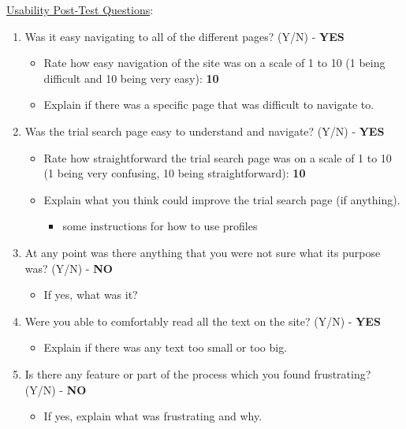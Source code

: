 \documentclass[12pt]{article}
\begin{document}
\noindent \underline{Usability Post-Test Questions}:
\begin{enumerate}
  \item Was it easy navigating to all of the different pages? (Y/N) - \textbf{YES}
    \begin{itemize}
      \item Rate how easy navigation of the site was on a scale of 1 to 10 (1 being difficult and 10 being very easy): \textbf{10}
      \item Explain if there was a specific page that was difficult to navigate to.
    \end{itemize}
	\item Was the trial search page easy to understand and navigate? (Y/N) - \textbf{YES}
    \begin{itemize}
      \item Rate how straightforward the trial search page was on a scale of 1 to 10 (1 being very confusing, 10 being straightforward): \textbf{10}
      \item Explain what you think could improve the trial search page (if anything).
      \begin{itemize}
        \item some instructions for how to use profiles
      \end{itemize}
    \end{itemize}
  \item At any point was there anything that you were not sure what its purpose was? (Y/N) - \textbf{NO}
    \begin{itemize}
      \item If yes, what was it?
    \end{itemize}
  \item Were you able to comfortably read all the text on the site? (Y/N) - \textbf{YES}
    \begin{itemize}
      \item Explain if there was any text too small or too big.
    \end{itemize}
  \item  Is there any feature or part of the process which you found frustrating? (Y/N) - \textbf{NO}
    \begin{itemize}
      \item If yes, explain what was frustrating and why.
    \end{itemize}
\end{enumerate}
\end{document}
